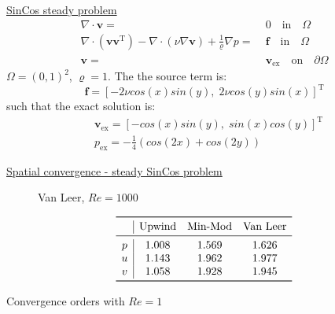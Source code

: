 \documentclass{beamer}
\begin{document}
\begin{frame}[label=spaceconvSupp]{\hyperlink{spaceconv}{SinCos steady problem}}
\begin{align*}
\nabla \cdot \mathbf{v} =& \; 0 \quad \text{in} \quad \Omega\\
\nabla \cdot (\mathbf{v} \mathbf{v^\mathrm{T}}) - \nabla \cdot (\nu 
\nabla \mathbf{v}) + \frac{1}{\varrho}\nabla p =& \; \mathbf{f} \quad \text{in} 
\quad \Omega\\
\mathbf{v} =& \; \mathbf{v}_\text{ex} \quad \text{on} \quad \partial \Omega
\end{align*}
$\Omega = (0,1)^2$, $\varrho = 1$. The the source term is:
\begin{equation*}
\mathbf{f} = [-2 \nu cos(x) sin(y), \; 2 \nu cos(y) sin(x)]^\mathrm{T}
\end{equation*}
such that the exact solution is:
\begin{align*}
&\mathbf{v}_\text{ex} = [-cos(x) sin(y), \; sin(x) cos(y)]^\mathrm{T}\\
&p_\text{ex} = -\frac{1}{4} (cos(2x)+cos(2y))
\end{align*}
\end{frame}
\begin{frame}{\hyperlink{spaceconv}{Spatial convergence - steady SinCos 
problem}}
\begin{figure}
	\centering
	
	\caption{\tiny Van Leer, $Re=1000$}
\end{figure}
\vspace{-0.3cm}
\begin{table}\footnotesize
	\[
	\begin{array}{c|ccc}
	\toprule
	& \text{Upwind} & \text{Min-Mod} & \text{Van Leer} \\ 
	\midrule
	p & 1.008 & 1.569 & 1.626\\
	u & 1.143 & 1.962 & 1.977\\
	v & 1.058 & 1.928 & 1.945\\
	\bottomrule
	\end{array}
	\]
	\caption{\tiny Convergence orders with $Re = 1$}
\end{table}
\end{frame}
\end{document}
